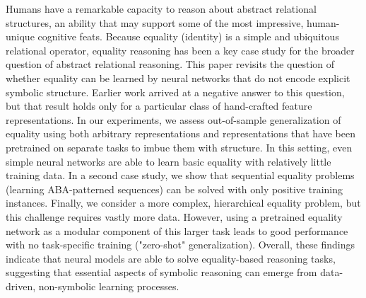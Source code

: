 Humans have a remarkable capacity to reason about abstract relational structures, an ability that may support some of the most impressive, human-unique cognitive feats. Because equality (identity) is a simple and ubiquitous relational operator, equality reasoning has been a key case study for the broader question of abstract relational reasoning. This paper revisits the question of whether equality can be learned by neural networks that do not encode explicit symbolic structure. Earlier work arrived at a negative answer to this question, but that result holds only for a particular class of hand-crafted feature representations. In our experiments, we assess out-of-sample generalization of equality using both arbitrary representations and representations that have been pretrained on separate tasks to imbue them with  structure. In this setting, even simple neural networks are able to learn basic equality with relatively little training data. In a second case study, we show that sequential equality problems (learning ABA-patterned sequences) can be solved with only positive training instances. Finally, we consider a more complex, hierarchical equality problem, but this challenge requires vastly more data. However, using a pretrained equality network as a modular component of this larger task leads to good performance with no task-specific training ("zero-shot" generalization). Overall, these findings indicate that neural models are able to solve equality-based reasoning tasks, suggesting that essential aspects of symbolic reasoning can emerge from data-driven, non-symbolic learning processes.
